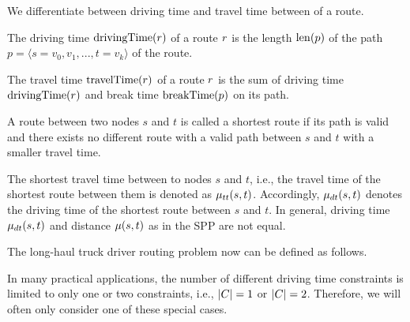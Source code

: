 We differentiate between driving time and travel time between of a route.

\begin{definition}
	The driving time $\operatorname{drivingTime}(r)$ of a route $r$ is the length $\operatorname{len}(p)$ of the path $p = \langle s=v_0,v_1,...,t=v_k \rangle$ of the route.
\end{definition}

\begin{definition}
	The travel time $\operatorname{travelTime}(r)$ of a route $r$ is the sum of driving time $\operatorname{drivingTime}(r)$ and break time  $\operatorname{breakTime}(p)$ on its path.
\end{definition}

\begin{definition}
	A route between two nodes $s$ and $t$ is called a shortest route if its path is valid and there exists no different route with a valid path between $s$ and $t$ with a smaller travel time.
\end{definition}

The shortest travel time between to nodes $s$ and $t$, i.e., the travel time of the shortest route between them is denoted as $\mu_{tt}(s,t)$. Accordingly, $\mu_{dt}(s,t)$ denotes the driving time of the shortest route between $s$ and $t$. In general, driving time $\mu_{dt}(s,t)$ and distance $\mu(s,t)$ as in the SPP are not equal.

The long-haul truck driver routing problem now can be defined as follows.

\begin{namedproblem}
\end{namedproblem}

In many practical applications, the number of different driving time constraints is limited to only one or two constraints, i.e., $|C| = 1$ or  $|C| = 2$. Therefore, we will often only consider one of these special cases.